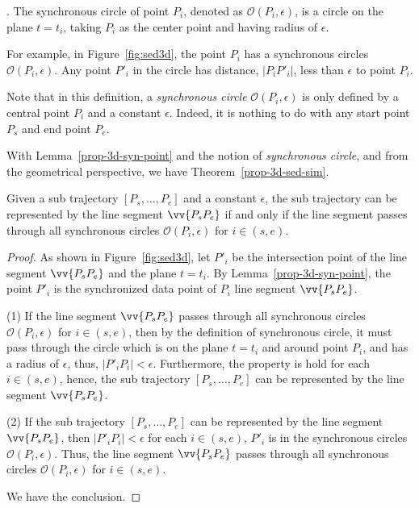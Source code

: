 . The synchronous circle of point $P_i$, denoted as $\mathcal{O}(P_i, \epsilon)$, is a circle on the plane $t=t_i$, taking $P_i$ as the center point and having radius of $\epsilon$. %

For example, in Figure~\ref{fig:sed3d}, the point $P_i$ has a synchronous circles $\mathcal{O}(P_i, \epsilon)$. Any point $P'_i$ in the circle has distance, \ie $|P_iP'_i|$, less than $\epsilon$ to point $P_i$.

Note that in this definition, a \emph{synchronous circle} $\mathcal{O}(P_i, \epsilon)$ is only defined by a central point $P_i$ and a constant $\epsilon$. Indeed, it is nothing to do with any start point $P_s$ and end point $P_e$.

With Lemma~\ref{prop-3d-syn-point} and the notion of \emph{synchronous circle}, and from the geometrical perspective, we have Theorem~\ref{prop-3d-sed-sim}.

\begin{theorem}
\label{prop-3d-sed-sim}
Given a sub trajectory $[P_s, \ldots, P_e]$ and a constant $\epsilon$, the sub trajectory can be represented by the line segment $\vv{P_sP_e}$ if and only if the line segment passes through all synchronous circles $\mathcal{O}(P_i, \epsilon)$ for $i \in (s, e)$.
\end{theorem}

\begin{proof}
As shown in Figure~\ref{fig:sed3d}, let $P'_i$ be the intersection point of the line segment $\vv{P_sP_e}$ and the plane $t=t_i$.
By Lemma~\ref{prop-3d-syn-point}, the point $P'_i$ is the synchronized data point of $P_i$ \wrt line segment $\vv{P_sP_e}$.

\ni (1) If the line segment $\vv{P_sP_e}$ passes through all synchronous circles $\mathcal{O}(P_i, \epsilon)$ for $i \in (s, e)$, then by the definition of synchronous circle, it must pass through the circle which is on the plane $t=t_i$ and around point $P_i$, and has a radius of $\epsilon$, thus, $|P'_iP_i| <\epsilon$. Furthermore, the property is hold for each $i \in (s, e)$, hence, the sub trajectory $[P_s, \ldots, P_e]$ can be represented by the line segment $\vv{P_sP_e}$.

\ni (2) If the sub trajectory $[P_s, \ldots, P_e]$ can be represented by the line segment $\vv{P_sP_e}$, then $|P'_iP_i| <\epsilon$ for each $i \in (s, e)$, \ie $P'_i$ is in the synchronous circles $\mathcal{O}(P_i, \epsilon)$. Thus, the line segment $\vv{P_sP_e}$ passes through all synchronous circles $\mathcal{O}(P_i, \epsilon)$ for $i \in (s, e)$.

We have the conclusion.
\end{proof}


